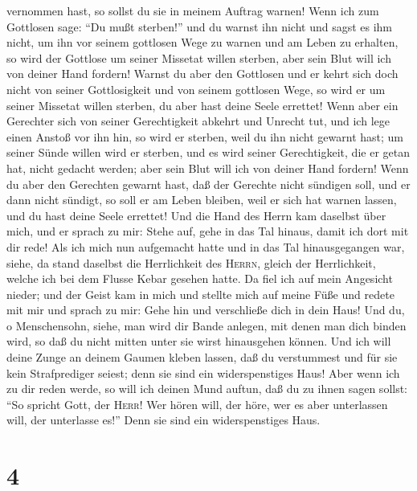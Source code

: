 vernommen hast, so sollst du sie in meinem Auftrag warnen!
 Wenn ich zum Gottlosen sage: ``Du mußt sterben!'' und du
warnst ihn nicht und sagst es ihm nicht, um ihn vor seinem gottlosen
Wege zu warnen und am Leben zu erhalten, so wird der Gottlose um seiner
Missetat willen sterben, aber sein Blut will ich von deiner Hand
fordern!  Warnst du aber den Gottlosen und er kehrt sich
doch nicht von seiner Gottlosigkeit und von seinem gottlosen Wege, so
wird er um seiner Missetat willen sterben, du aber hast deine Seele
errettet!  Wenn aber ein Gerechter sich von seiner
Gerechtigkeit abkehrt und Unrecht tut, und ich lege einen Anstoß vor ihn
hin, so wird er sterben, weil du ihn nicht gewarnt hast; um seiner Sünde
willen wird er sterben, und es wird seiner Gerechtigkeit, die er getan
hat, nicht gedacht werden; aber sein Blut will ich von deiner Hand
fordern!  Wenn du aber den Gerechten gewarnt hast, daß
der Gerechte nicht sündigen soll, und er dann nicht sündigt, so soll er
am Leben bleiben, weil er sich hat warnen lassen, und du hast deine
Seele errettet!  Und die Hand des Herrn kam daselbst über
mich, und er sprach zu mir: Stehe auf, gehe in das Tal hinaus, damit ich
dort mit dir rede!  Als ich mich nun aufgemacht hatte und
in das Tal hinausgegangen war, siehe, da stand daselbst die Herrlichkeit
des \textsc{Herrn}, gleich der Herrlichkeit, welche ich bei dem Flusse
Kebar gesehen hatte. Da fiel ich auf mein Angesicht nieder;
 und der Geist kam in mich und stellte mich auf meine
Füße und redete mit mir und sprach zu mir: Gehe hin und verschließe dich
in dein Haus!  Und du, o Menschensohn, siehe, man wird
dir Bande anlegen, mit denen man dich binden wird, so daß du nicht
mitten unter sie wirst hinausgehen können.  Und ich will
deine Zunge an deinem Gaumen kleben lassen, daß du verstummest und für
sie kein Strafprediger seiest; denn sie sind ein widerspenstiges Haus!
 Aber wenn ich zu dir reden werde, so will ich deinen
Mund auftun, daß du zu ihnen sagen sollst: ``So spricht Gott, der
\textsc{Herr}! Wer hören will, der höre, wer es aber unterlassen will,
der unterlasse es!'' Denn sie sind ein widerspenstiges Haus.

\hypertarget{section-3}{%
\section{4}\label{section-3}}

